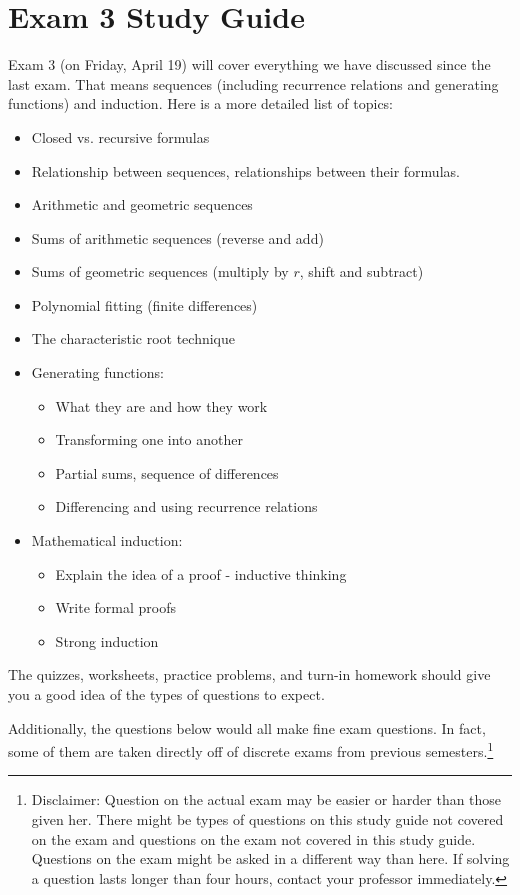 \section{Exam 3 Study Guide}

Exam 3 (on Friday, April 19) will cover everything we have discussed since the last exam.  That means sequences (including recurrence relations and generating functions) and induction.  Here is a more detailed list of topics:

\begin{itemize}
 \item Closed vs. recursive formulas
 \item Relationship between sequences, relationships between their formulas.
 \item Arithmetic and geometric sequences
 \item Sums of arithmetic sequences (reverse and add)
 \item Sums of geometric sequences (multiply by $r$, shift and subtract)
 \item Polynomial fitting (finite differences)
 \item The characteristic root technique
 \item Generating functions:
 \begin{itemize}
 	\item What they are and how they work
 	\item Transforming one into another
 	\item Partial sums, sequence of differences
 	\item Differencing and using recurrence relations
 \end{itemize}
 \item Mathematical induction:
 \begin{itemize}
 	\item Explain the idea of a proof - inductive thinking
 	\item Write formal proofs
 	\item Strong induction 
 \end{itemize}
\end{itemize}


The quizzes, worksheets, practice problems, and turn-in homework should give you a good idea of the types of questions to expect.  

Additionally, the questions below would all make fine exam questions.  In fact, some of them are taken directly off of discrete exams from previous semesters.\footnote{Disclaimer: Question on the actual exam may be easier or harder than those given her.  There might be types of questions on this study guide not covered on the exam and questions on the exam not covered in this study guide.  Questions on the exam might be asked in a different way than here.  If solving a question lasts longer than four hours, contact your professor immediately.}  



